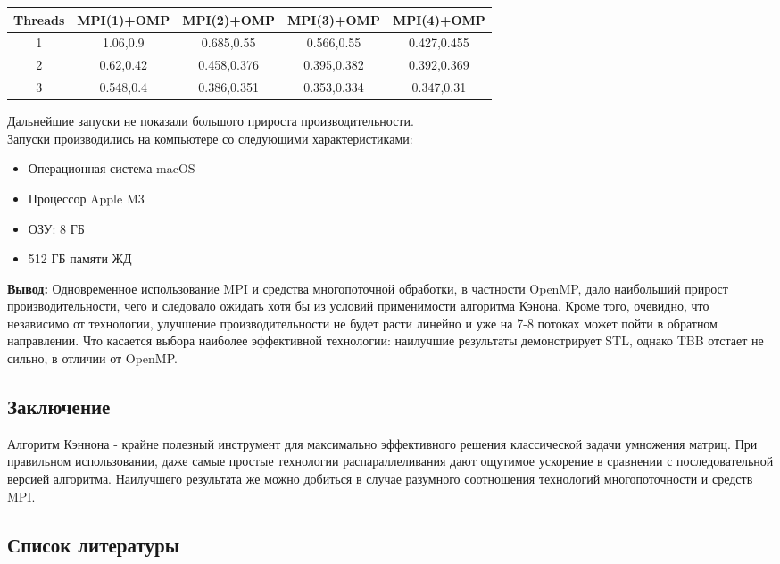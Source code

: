 \documentclass[12pt]{article}
\begin{document}
\begin{center}
    \begin{tabular}{|c|c|c|c|c|}
    \cline{1-5}
     Threads & MPI(1)+OMP & MPI(2)+OMP & MPI(3)+OMP & MPI(4)+OMP\\  \hline
      1 & 1.06,0.9 & 0.685,0.55 & 0.566,0.55 & 0.427,0.455 \\ \hline
      2 & 0.62,0.42 & 0.458,0.376 & 0.395,0.382 & 0.392,0.369\\ \hline
      3 & 0.548,0.4 & 0.386,0.351 & 0.353,0.334 & 0.347,0.31 \\ \hline
    \cline{1-5}
    \end{tabular}
\end{center} 

Дальнейшие запуски не показали большого прироста производительности. \\
Запуски производились на компьютере со следующими характеристиками:

\begin{itemize}
    \item Операционная система macOS
    \item Процессор Apple M3
    \item ОЗУ: 8 ГБ
    \item 512 ГБ памяти ЖД
\end{itemize} 

\textbf{Вывод:} Одновременное использование MPI и средства многопоточной обработки, в частности OpenMP, дало наибольший прирост производительности, чего и следовало ожидать хотя бы из условий применимости алгоритма Кэнона. Кроме того, очевидно, что независимо от технологии, улучшение производительности не будет расти линейно и уже на 7-8 потоках может пойти в обратном направлении. Что касается выбора наиболее эффективной технологии: наилучшие результаты демонстрирует STL, однако TBB отстает не сильно, в отличии от OpenMP.
\newpage
\begin{center}
    \section{Заключение}
\end{center} 

Алгоритм Кэннона - крайне полезный инструмент для максимально эффективного решения классической задачи умножения матриц. При правильном использовании, даже самые простые технологии распараллеливания дают ощутимое ускорение в сравнении с последовательной версией алгоритма. Наилучшего результата же можно добиться в случае разумного соотношения технологий многопоточности и средств MPI. 
\newpage
\begin{center}
    \section{Список литературы}
\end{center} 
\end{document}

